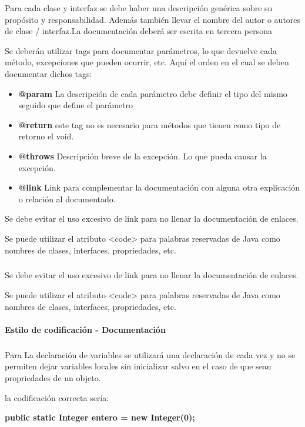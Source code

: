 Para cada clase y interfaz se debe haber una descripción genérica sobre su propósito y responsabilidad. Además también llevar el nombre del autor o autores de clase / interfaz.La documentación deberá ser escrita en tercera persona

Se deberán utilizar tags  para documentar parámetros, lo que devuelve cada método, excepciones que pueden ocurrir, etc. Aquí el orden en el cual se deben documentar dichos tags:

\begin{itemize}
\item \textbf{@param }
  La descripción de cada parámetro debe definir el tipo del mismo seguido que define el parámetro
\item \textbf{@return }
  este tag no es necesario para métodos que tienen como tipo de retorno el void.
\item \textbf{@throws }
  Descripción breve de la excepción. Lo que pueda causar la excepción.
\item \textbf{@link }
  Link para complementar la documentación con alguna otra explicación o relación al documentado. 
\end{itemize}

Se debe evitar el uso excesivo de link para no llenar la documentación de enlaces.

Se puede utilizar el atributo <code> para palabras reservadas de Java como nombres de clases, interfaces, propriedades, etc.


\subparagraph{}
Se debe evitar el uso excesivo de link para no llenar la documentación de enlaces.

Se puede utilizar el atributo <code> para palabras reservadas de Java como nombres de clases, interfaces, propriedades, etc.

\paragraph{Estilo de codificación - Documentación}
\subparagraph{}
Para La declaración de variables se utilizará una declaración de cada vez y no se permiten dejar variables locales sin inicializar salvo en el caso de que sean propriedades de un objeto.

la codificación correcta sería:

\textbf{public static Integer entero = new Integer(0);}
